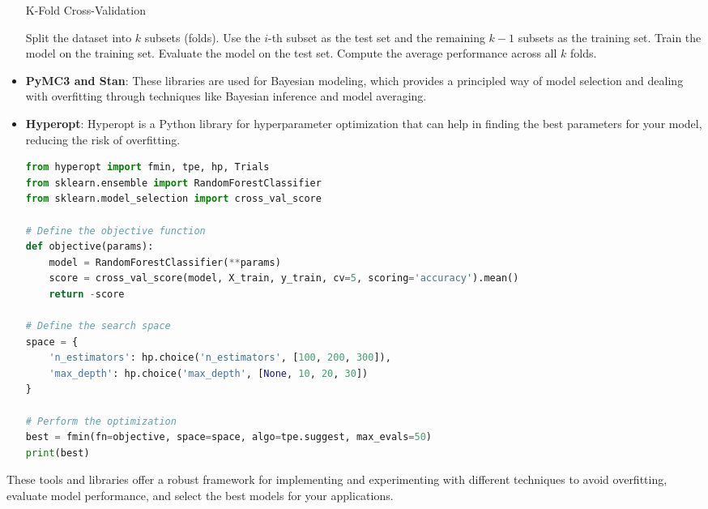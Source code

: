 \documentclass[12pt]{book} %
\begin{document}
\begin{itemize}
\begin{algorithm}[H]
\caption{K-Fold Cross-Validation}
\begin{algorithmic}[1]
\State Split the dataset into $k$ subsets (folds).
    \State Use the $i$-th subset as the test set and the remaining $k-1$ subsets as the training set.
    \State Train the model on the training set.
    \State Evaluate the model on the test set.
\EndFor
\State Compute the average performance across all $k$ folds.
\end{algorithmic}
\end{algorithm}

    \item \textbf{PyMC3 and Stan}:
    These libraries are used for Bayesian modeling, which provides a principled way of model selection and dealing with overfitting through techniques like Bayesian inference and model averaging.

    \item \textbf{Hyperopt}:
    Hyperopt is a Python library for hyperparameter optimization that can help in finding the best parameters for your model, reducing the risk of overfitting.

\begin{lstlisting}[language=Python, caption=Using Hyperopt for Hyperparameter Optimization]
from hyperopt import fmin, tpe, hp, Trials
from sklearn.ensemble import RandomForestClassifier
from sklearn.model_selection import cross_val_score

# Define the objective function
def objective(params):
    model = RandomForestClassifier(**params)
    score = cross_val_score(model, X_train, y_train, cv=5, scoring='accuracy').mean()
    return -score

# Define the search space
space = {
    'n_estimators': hp.choice('n_estimators', [100, 200, 300]),
    'max_depth': hp.choice('max_depth', [None, 10, 20, 30])
}

# Perform the optimization
best = fmin(fn=objective, space=space, algo=tpe.suggest, max_evals=50)
print(best)
\end{lstlisting}
    \FloatBarrier
\end{itemize}

These tools and libraries offer a robust framework for implementing and experimenting with different techniques to avoid overfitting, evaluate model performance, and select the best models for your applications.
\end{document}
